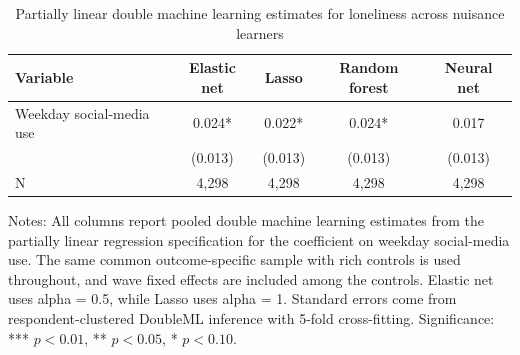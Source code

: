 \begin{table}[!htbp]
\centering
\caption{Partially linear double machine learning estimates for loneliness across nuisance learners}
\label{tab:dml_loneliness_methods}
\begin{tabular}{lcccc}
\hline
Variable & Elastic net & Lasso & Random forest & Neural net
\\
\hline
Weekday social-media use & 0.024* & 0.022* & 0.024* & 0.017
\\
 & (0.013) & (0.013) & (0.013) & (0.013)
\\
N & 4,298 & 4,298 & 4,298 & 4,298
\\
\hline
\end{tabular}
\begin{minipage}{0.95\textwidth}
\footnotesize Notes: All columns report pooled double machine learning estimates from the partially linear regression specification for the coefficient on weekday social-media use. The same common outcome-specific sample with rich controls is used throughout, and wave fixed effects are included among the controls. Elastic net uses alpha = 0.5, while Lasso uses alpha = 1. Standard errors come from respondent-clustered DoubleML inference with 5-fold cross-fitting. Significance: *** \(p < 0.01\), ** \(p < 0.05\), * \(p < 0.10\).
\end{minipage}
\end{table}
